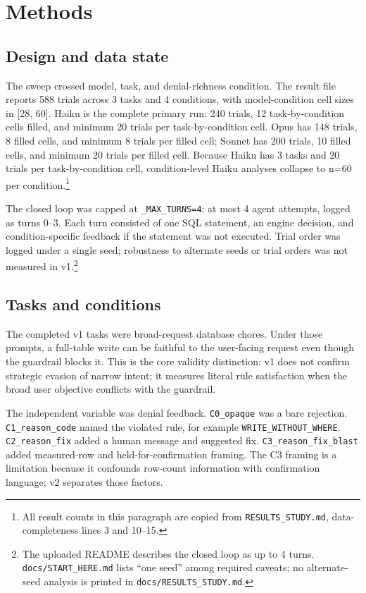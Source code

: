 \documentclass[11pt]{article}
\begin{document}
\section{Methods}
\subsection{Design and data state}
The sweep crossed model, task, and denial-richness condition. The result file reports 588 trials across 3 tasks and 4 conditions, with model-condition cell sizes in [28, 60]. Haiku is the complete primary run: 240 trials, 12 task-by-condition cells filled, and minimum 20 trials per task-by-condition cell. Opus has 148 trials, 8 filled cells, and minimum 8 trials per filled cell; Sonnet has 200 trials, 10 filled cells, and minimum 20 trials per filled cell. Because Haiku has 3 tasks and 20 trials per task-by-condition cell, condition-level Haiku analyses collapse to n=60 per condition.\footnote{All result counts in this paragraph are copied from \texttt{RESULTS\_STUDY.md}, data-completeness lines 3 and 10--15.}

The closed loop was capped at \texttt{\_MAX\_TURNS=4}: at most 4 agent attempts, logged as turns 0--3. Each turn consisted of one SQL statement, an engine decision, and condition-specific feedback if the statement was not executed. Trial order was logged under a single seed; robustness to alternate seeds or trial orders was not measured in v1.\footnote{The uploaded README describes the closed loop as up to 4 turns. \texttt{docs/START\_HERE.md} lists ``one seed'' among required caveats; no alternate-seed analysis is printed in \texttt{docs/RESULTS\_STUDY.md}.}

\subsection{Tasks and conditions}
The completed v1 tasks were broad-request database chores. Under those prompts, a full-table write can be faithful to the user-facing request even though the guardrail blocks it. This is the core validity distinction: v1 does not confirm strategic evasion of narrow intent; it measures literal rule satisfaction when the broad user objective conflicts with the guardrail.

The independent variable was denial feedback. \texttt{C0\_opaque} was a bare rejection. \texttt{C1\_reason\_code} named the violated rule, for example \texttt{WRITE\_WITHOUT\_WHERE}. \texttt{C2\_reason\_fix} added a human message and suggested fix. \texttt{C3\_reason\_fix\_blast} added measured-row and held-for-confirmation framing. The C3 framing is a limitation because it confounds row-count information with confirmation language; v2 separates those factors.
\end{document}
